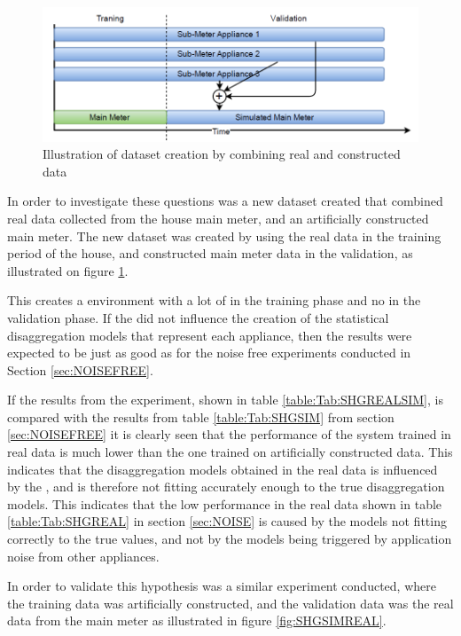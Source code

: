 \begin{figure}[H]
\centering
\includegraphics[width=1\textwidth]{billeder/REALSIM.png}
\caption{Illustration of dataset creation by combining real and constructed data}
\label{fig:REALSIMILU}
\end{figure}

In order to investigate these questions was a new dataset created that combined real data collected from the house main meter, and an artificially constructed main meter. The new dataset was created by using the real data in the training period of the house, and constructed main meter data in the validation, as illustrated on figure \ref{fig:REALSIMILU}.

This creates a environment with a lot of  in the training phase and no  in the validation phase. If the  did not influence the creation of the statistical disaggregation models that represent each appliance, then the results were expected to be just as good as for the noise free experiments conducted in Section \ref{sec:NOISEFREE}.




If the results from the experiment, shown in table \ref{table:Tab:SHGREALSIM}, is compared with the results from table \ref{table:Tab:SHGSIM} from section \ref{sec:NOISEFREE} it is clearly seen that the performance of the system trained in real data is much lower than the one trained on artificially constructed data. This indicates that the disaggregation models obtained in the real data is influenced by the , and is therefore not fitting accurately enough to the true disaggregation models. This indicates that the low performance in the real data shown in table \ref{table:Tab:SHGREAL} in section \ref{sec:NOISE} is caused by the models not fitting correctly to the true values, and not by the models being triggered by application noise from other appliances.

In order to validate this hypothesis was a similar experiment conducted, where the training data was artificially constructed, and the validation data was the real data from the main meter as illustrated in figure \ref{fig:SHGSIMREAL}. 

